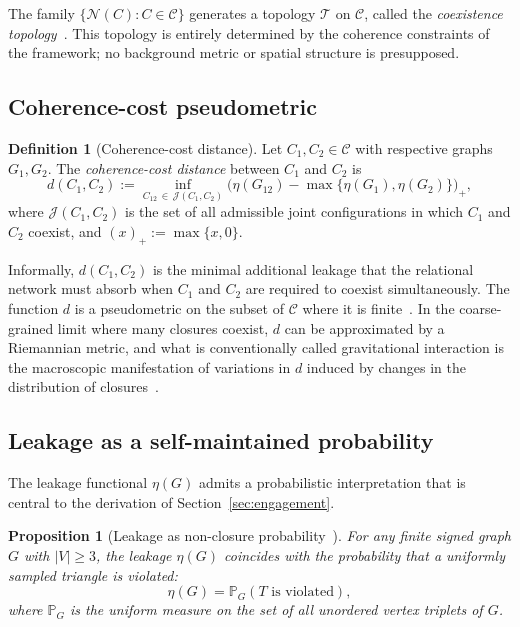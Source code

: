 \documentclass[11pt,a4paper]{article}
\newtheorem{proposition}[theorem]{Proposition}
\theoremstyle{definition}
\newtheorem{definition}[theorem]{Definition}
\newcommand{\Cconf}{\mathcal{C}}
\newcommand{\Prob}{\mathbb{P}}
\begin{document}
The family $\{\mathcal{N}(C) : C \in \Cconf\}$ generates a topology $\mathscr{T}$ on $\Cconf$, called the \emph{coexistence topology}~\cite{Topological_Reformulation_PDL_2026}. This topology is entirely determined by the coherence constraints of the framework; no background metric or spatial structure is presupposed.

\subsection{Coherence-cost pseudometric}
\label{subsec:pseudometric}

\begin{definition}[Coherence-cost distance]
\label{def:cohcost}
Let $C_1, C_2 \in \Cconf$ with respective graphs $G_1, G_2$. The \emph{coherence-cost distance} between $C_1$ and $C_2$ is
\begin{equation}
  \label{eq:d_def}
  d(C_1,C_2) := \inf_{C_{12}\,\in\,\mathcal{J}(C_1,C_2)} \bigl(\eta(G_{12}) - \max\{\eta(G_1),\eta(G_2)\}\bigr)_+,
\end{equation}
where $\mathcal{J}(C_1,C_2)$ is the set of all admissible joint configurations in which $C_1$ and $C_2$ coexist, and $(x)_+ := \max\{x,0\}$.
\end{definition}

Informally, $d(C_1,C_2)$ is the minimal additional leakage that the relational network must absorb when $C_1$ and $C_2$ are required to coexist simultaneously. The function $d$ is a pseudometric on the subset of $\Cconf$ where it is finite~\cite{Topological_Reformulation_PDL_2026}. In the coarse-grained limit where many closures coexist, $d$ can be approximated by a Riemannian metric, and what is conventionally called gravitational interaction is the macroscopic manifestation of variations in $d$ induced by changes in the distribution of closures~\cite{PDL_Main_2026}.

\subsection{Leakage as a self-maintained probability}
\label{subsec:leakage_prob}

The leakage functional $\eta(G)$ admits a probabilistic interpretation that is central to the derivation of Section~\ref{sec:engagement}.

\begin{proposition}[Leakage as non-closure probability~{\cite{Topological_Reformulation_PDL_2026}}]
\label{prop:leakage_prob}
For any finite signed graph $G$ with $|V| \geq 3$, the leakage $\eta(G)$ coincides with the probability that a uniformly sampled triangle is violated:
\begin{equation}
  \label{eq:leakage_prob}
  \eta(G) = \Prob_G(T \text{ is violated}),
\end{equation}
where $\Prob_G$ is the uniform measure on the set of all unordered vertex triplets of $G$.
\end{proposition}
\end{document}
